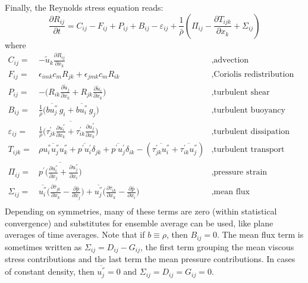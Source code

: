 Finally, the Reynolds stress equation reads:
\begin{equation}
  \frac{\partial R_{ij}}{\partial t}  = C_{ij} - F_{ij} + P_{ij}  + B_{ij} - \varepsilon_{ij} +
  \frac{1}{\bar{\rho}}\left(\Pi_{ij} - \frac{\partial T_{ijk}}{ \partial
    x_k}  + \Sigma_{ij} \right)
\end{equation}
where
\begin{eqnarray*}
  C_{ij} =&  - \tilde{u}_k \frac{\partial
    R_{ij}}{\partial x_k} & ,\text{advection} \\
  F_{ij} =&  \epsilon_{imk}c_m R_{jk} + \epsilon_{jmk}c_m R_{ik} &,
  \text{Coriolis redistribution}\\
  P_{ij} =&  - \biggl( R_{ik} \frac{\partial \tilde{u}_j}{
    \partial x_k} + R_{jk} \frac{\partial \tilde{u}_i}{
    \partial x_k}\biggr) & ,\text{turbulent shear production} \\
  B_{ij} =& \frac{1}{\bar{\rho}} \biggl(
  \overline{bu^{''}_j}\,g_i+\overline{bu^{''}_i}\,g_j \biggr) &,
  \text{turbulent buoyancy production}\\
  \varepsilon_{ij} =& \frac{1}{\bar{\rho}} \biggl( \overline{ 
    \tau^{'}_{jk}
    \frac{\partial u^{''}_i}{\partial x_k} + \tau^{'}_{ik}
    \frac{\partial u^{''}_j}{\partial x_k}}\biggr) & , \text{turbulent dissipation}\\
  T_{ijk} =& \overline{\rho u^{''}_i u^{''}_j u^{''}_k} +
  \overline{p^{'}u^{'}_i} \delta_{jk} + \overline{p^{'}u^{'}_j} 
  \delta_{ik} - ( \overline{\tau^{'}_{jk} u^{''}_i} + 
  \overline{\tau^{'}_{ik} u^{''}_j}) & , \text{turbulent transport} \\
  \Pi_{ij} =& \overline{p^{'}\biggl( \frac{\partial u^{''}_i}{
      \partial x_j}+ \frac{\partial u^{''}_j}{\partial x_i} \biggr)} & , \text{pressure strain} \\
  \Sigma_{ij} =&  \overline{u^{''}_i} \biggl( \frac{\partial \bar{\tau}_{jk}}{
    \partial x_k} - \frac{\partial \bar{p}}{\partial x_j} \biggr) +  
  \overline{u^{''}_j} \biggl( \frac{\partial \bar{\tau}_{ik}}{
    \partial x_k} - \frac{\partial \bar{p}}{\partial x_i} \biggr)& , \text{mean flux}\\
\end{eqnarray*}
Depending on symmetries, many of these terms are zero (within statistical
convergence) and substitutes for ensemble average can be used, like plane
averages of time averages.  Note that if $b\equiv \rho$, then $B_{ij}=0$. The
mean flux term is sometimes written as $\Sigma_{ij}=D_{ij}-G_{ij}$, the first
term grouping the mean viscous stress contributions and the last term the mean
pressure contributions. In cases of constant density, then
$\overline{u^{''}_j}=0$ and $\Sigma_{ij}=D_{ij}=G_{ij}=0$.

